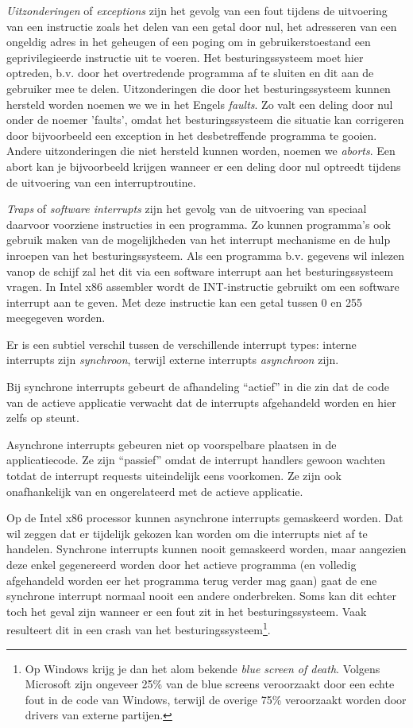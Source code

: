 \emph{Uitzonderingen} of \emph{exceptions} zijn het gevolg van een fout tijdens
de uitvoering van een instructie zoals het delen van een getal door
nul, het adresseren van een ongeldig adres in het geheugen of een
poging om in gebruikerstoestand een geprivilegieerde instructie uit te
voeren. Het besturingssysteem moet hier optreden, b.v. door het
overtredende programma af te sluiten en dit aan de gebruiker mee te
delen. Uitzonderingen die door het besturingssysteem kunnen hersteld worden noemen we we in
het Engels \emph{faults}. Zo valt een deling door nul onder de noemer 'faults', omdat het besturingssysteem die situatie kan corrigeren door bijvoorbeeld een exception in het desbetreffende programma te gooien. Andere uitzonderingen die niet hersteld kunnen worden, noemen we \emph{aborts}. Een abort kan je bijvoorbeeld krijgen wanneer er een deling door nul optreedt tijdens de uitvoering van een interruptroutine.

\emph{Traps} of \emph{software interrupts} zijn het gevolg van de uitvoering van speciaal
daarvoor voorziene instructies in een programma. Zo kunnen programma's
ook gebruik maken van de mogelijkheden van het interrupt mechanisme en
de hulp inroepen van het besturingssysteem. Als een programma b.v.
gegevens wil inlezen vanop de schijf zal het dit via een software
interrupt aan het besturingssysteem vragen. In Intel x86 assembler wordt de INT-instructie gebruikt om een
software interrupt aan te geven. Met deze instructie kan een getal
tussen 0 en 255 meegegeven worden.

Er is een subtiel verschil tussen de verschillende interrupt types: interne interrupts zijn
\emph{synchroon}, terwijl externe interrupts \emph{asynchroon} zijn.

Bij synchrone interrupts gebeurt de afhandeling ``actief'' in die zin dat de code van de
actieve applicatie verwacht dat de interrupts afgehandeld worden en hier zelfs op steunt.

Asynchrone interrupts gebeuren niet op voorspelbare plaatsen in de applicatiecode. Ze zijn
``passief'' omdat de interrupt handlers gewoon wachten totdat de interrupt requests
uiteindelijk eens voorkomen. Ze zijn ook onafhankelijk van en ongerelateerd met de actieve applicatie.

Op de Intel x86 processor kunnen asynchrone interrupts gemaskeerd worden. Dat wil zeggen
dat er tijdelijk gekozen kan worden om die interrupts niet af te handelen. Synchrone
interrupts kunnen nooit gemaskeerd worden, maar aangezien deze enkel gegenereerd worden
door het actieve programma (en volledig afgehandeld worden eer het programma terug verder mag
gaan) gaat de ene synchrone interrupt normaal nooit een andere onderbreken. Soms kan dit
echter toch het geval zijn wanneer er een fout zit in het besturingssysteem. Vaak resulteert
dit in een crash van het besturingssysteem\footnote{Op Windows krijg je dan het alom bekende
\emph{blue screen of death}. Volgens Microsoft zijn ongeveer 25\% van de blue screens veroorzaakt
door een echte fout in de code van Windows, terwijl de overige 75\% veroorzaakt worden door drivers
van externe partijen.}.

